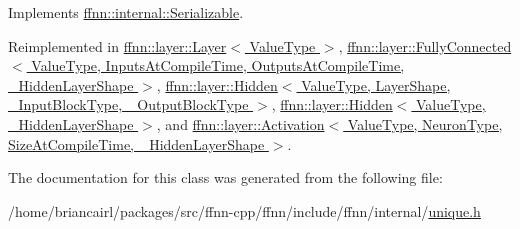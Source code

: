 Implements \hyperlink{classffnn_1_1internal_1_1_serializable_a98b43aa17c4986e8a1b809b9d64796bb}{ffnn\-::internal\-::\-Serializable}.



Reimplemented in \hyperlink{classffnn_1_1layer_1_1_layer_ac265fc929a178b111337226dd1cb62b6}{ffnn\-::layer\-::\-Layer$<$ Value\-Type $>$}, \hyperlink{classffnn_1_1layer_1_1_fully_connected_a7c79eb99c638b61f76ea34b725c0aeef}{ffnn\-::layer\-::\-Fully\-Connected$<$ Value\-Type, Inputs\-At\-Compile\-Time, Outputs\-At\-Compile\-Time, \-\_\-\-Hidden\-Layer\-Shape $>$}, \hyperlink{classffnn_1_1layer_1_1_hidden_a184844a0eadeb1aa27e29b24cbb0008c}{ffnn\-::layer\-::\-Hidden$<$ Value\-Type, Layer\-Shape, \-\_\-\-Input\-Block\-Type, \-\_\-\-Output\-Block\-Type $>$}, \hyperlink{classffnn_1_1layer_1_1_hidden_a184844a0eadeb1aa27e29b24cbb0008c}{ffnn\-::layer\-::\-Hidden$<$ Value\-Type, \-\_\-\-Hidden\-Layer\-Shape $>$}, and \hyperlink{classffnn_1_1layer_1_1_activation_af4fa0c4e44033921fe6ada1dcd0c0560}{ffnn\-::layer\-::\-Activation$<$ Value\-Type, Neuron\-Type, Size\-At\-Compile\-Time, \-\_\-\-Hidden\-Layer\-Shape $>$}.



The documentation for this class was generated from the following file\-:\begin{DoxyCompactItemize}
\item 
/home/briancairl/packages/src/ffnn-\/cpp/ffnn/include/ffnn/internal/\hyperlink{unique_8h}{unique.\-h}\end{DoxyCompactItemize}
